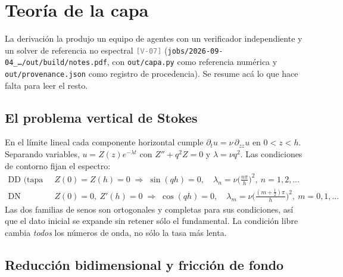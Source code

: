 \documentclass[11pt,a4paper]{article}
\newcommand{\etq}[1]{\textcolor{gray}{\texttt{[#1]}}}
\begin{document}
\section{Teoría de la capa}
\label{sec:teoria}

La derivación la produjo un equipo de agentes con un verificador independiente y un
solver de referencia no espectral \etq{V-07}
(\texttt{jobs/2026-09-04\_\ldots/out/build/notes.pdf}, con \texttt{out/capa.py} como
referencia numérica y \texttt{out/provenance.json} como registro de procedencia). Se
resume acá lo que hace falta para leer el resto.

\subsection{El problema vertical de Stokes}

En el límite lineal cada componente horizontal cumple $\partial_t u=\nu\,\partial_{zz}u$
en $0<z<h$. Separando variables, $u=Z(z)e^{-\lambda t}$ con $Z''+q^2Z=0$ y
$\lambda=\nu q^2$. Las condiciones de contorno fijan el espectro:
\begin{align}
  \text{DD (tapa rígida):}\; & Z(0)=Z(h)=0 \;\Rightarrow\; \sin(qh)=0,\quad
  \lambda_n=\nu\Big(\frac{n\pi}{h}\Big)^2,\ n=1,2,\ldots\\
  \text{DN (superficie libre):}\; & Z(0)=0,\ Z'(h)=0 \;\Rightarrow\; \cos(qh)=0,\quad
  \lambda_m=\nu\Big(\frac{(m+\tfrac12)\pi}{h}\Big)^2,\ m=0,1,\ldots
  \label{eq:dn}
\end{align}
Las dos familias de senos son ortogonales y completas para sus condiciones, así que el
dato inicial se expande sin retener sólo el fundamental. La condición libre cambia
\emph{todos} los números de onda, no sólo la tasa más lenta.

\subsection{Reducción bidimensional y fricción de fondo}
\label{sec:reduccion}
\end{document}
